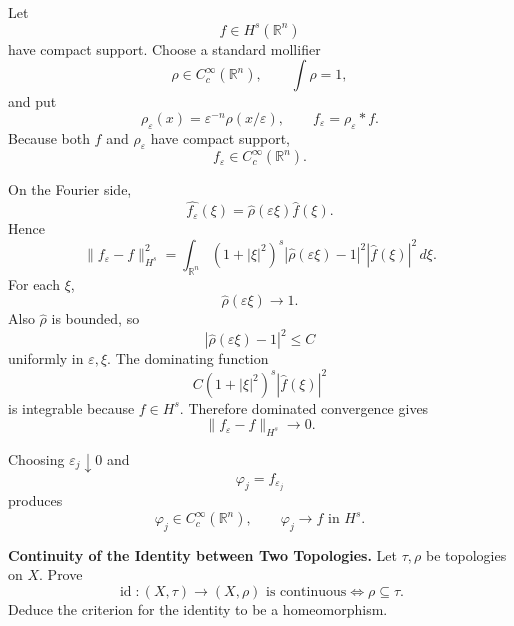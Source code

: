 \begin{solution}
Let
\[
f\in H^s(\mathbb R^n)
\]
have compact support. Choose a standard mollifier
\[
\rho\in C_c^\infty(\mathbb R^n),
\qquad
\int\rho=1,
\]
and put
\[
\rho_\varepsilon(x)
=
\varepsilon^{-n}\rho(x/\varepsilon),
\qquad
f_\varepsilon=\rho_\varepsilon*f.
\]
Because both \(f\) and \(\rho_\varepsilon\) have compact support,
\[
f_\varepsilon\in C_c^\infty(\mathbb R^n).
\]

On the Fourier side,
\[
\widehat{f_\varepsilon}(\xi)
=
\widehat\rho(\varepsilon\xi)\widehat f(\xi).
\]
Hence
\[
\|f_\varepsilon-f\|_{H^s}^2
=
\int_{\mathbb R^n}
(1+|\xi|^2)^s
\left|
\widehat\rho(\varepsilon\xi)-1
\right|^2
|\widehat f(\xi)|^2\,d\xi.
\]
For each \(\xi\),
\[
\widehat\rho(\varepsilon\xi)\longrightarrow1.
\]
Also \(\widehat\rho\) is bounded, so
\[
\left|
\widehat\rho(\varepsilon\xi)-1
\right|^2
\le C
\]
uniformly in \(\varepsilon,\xi\). The dominating function
\[
C(1+|\xi|^2)^s|\widehat f(\xi)|^2
\]
is integrable because \(f\in H^s\). Therefore dominated convergence gives
\[
\|f_\varepsilon-f\|_{H^s}\longrightarrow0.
\]

Choosing \(\varepsilon_j\downarrow0\) and
\[
\varphi_j=f_{\varepsilon_j}
\]
produces
\[
\boxed{
\varphi_j\in C_c^\infty(\mathbb R^n),
\qquad
\varphi_j\to f\text{ in }H^s.
}
\]
\end{solution}


\begin{problem}[CP-II-0092]
\label{prob:cp-ii-0092}
\textbf{Continuity of the Identity between Two Topologies.}
Let \(\tau,\rho\) be topologies on \(X\). Prove
\[
\operatorname{id}:(X,\tau)\to(X,\rho)\text{ is continuous}
\iff \rho\subseteq\tau.
\]
Deduce the criterion for the identity to be a homeomorphism.
\end{problem}

